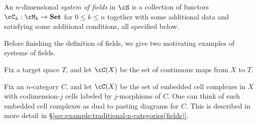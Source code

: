 An $n$-dimensional {\it system of fields} in $\cS$
is a collection of functors $\cC_k : \cM_k \to \Set$ for $0 \leq k \leq n$
together with some additional data and satisfying some additional conditions, all specified below.

Before finishing the definition of fields, we give two motivating examples of systems of fields.

\begin{example}
\label{ex:maps-to-a-space(fields)}
Fix a target space $T$, and let $\cC(X)$ be the set of continuous maps
from $X$ to $T$.
\end{example}

\begin{example}
\label{ex:traditional-n-categories(fields)}
Fix an $n$-category $C$, and let $\cC(X)$ be 
the set of embedded cell complexes in $X$ with codimension-$j$ cells labeled by
$j$-morphisms of $C$.
One can think of such embedded cell complexes as dual to pasting diagrams for $C$.
This is described in more detail in \S \ref{sec:example:traditional-n-categories(fields)}.
\end{example}


